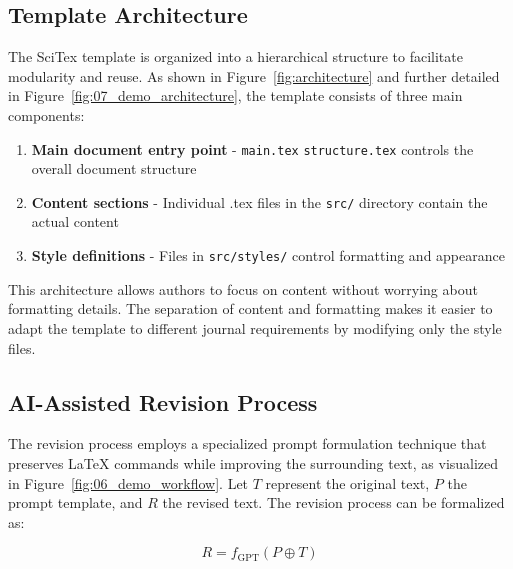 \documentclass[preprint,review,12pt]{elsarticle}%
\providecommand{\DIFaddbegin}{} %
\providecommand{\DIFaddend}{} %
\providecommand{\DIFdelbegin}{} %
\providecommand{\DIFdelend}{} %
\newcommand{\DIFscaledelfig}{0.5}
\newlength{\DIFdelgraphicswidth} %
\newlength{\DIFdelgraphicsheight} %
\newcommand{\DIFaddincludegraphics}[2][]{{\color{blue}\fbox{\DIFOincludegraphics[#1]{#2}}}} %
\newcommand{\DIFdelincludegraphics}[2][]{%
\sbox{\DIFdelgraphicsbox}{\DIFOincludegraphics[#1]{#2}}%
\settoboxwidth{\DIFdelgraphicswidth}{\DIFdelgraphicsbox} %
\settoboxtotalheight{\DIFdelgraphicsheight}{\DIFdelgraphicsbox} %
\scalebox{\DIFscaledelfig}{%
\parbox[b]{\DIFdelgraphicswidth}{\usebox{\DIFdelgraphicsbox}\\[-\baselineskip] \rule{\DIFdelgraphicswidth}{0em}}\llap{\resizebox{\DIFdelgraphicswidth}{\DIFdelgraphicsheight}{%
\setlength{\unitlength}{\DIFdelgraphicswidth}%
\begin{picture}(1,1)%
\thicklines\linethickness{2pt} %
{\color[rgb]{1,0,0}\put(0,0){\framebox(1,1){}}}%
{\color[rgb]{1,0,0}\put(0,0){\line( 1,1){1}}}%
{\color[rgb]{1,0,0}\put(0,1){\line(1,-1){1}}}%
\end{picture}%
}\hspace*{3pt}}} %
} %
\DeclareRobustCommand{\DIFaddbegin}{\DIFOaddbegin \let\includegraphics\DIFaddincludegraphics} %
\DeclareRobustCommand{\DIFaddend}{\DIFOaddend \let\includegraphics\DIFOincludegraphics} %
\DeclareRobustCommand{\DIFdelbegin}{\DIFOdelbegin \let\includegraphics\DIFdelincludegraphics} %
\DeclareRobustCommand{\DIFdelend}{\DIFOaddend \let\includegraphics\DIFOincludegraphics} %
\begin{document}
\begin{frontmatter}

\subsection{Template Architecture}
\label{subsec:architecture}

The SciTex template is organized into a hierarchical structure to facilitate modularity and reuse. As shown in Figure~\ref{fig:architecture} and further detailed in Figure~\ref{fig:07_demo_architecture}, the template consists of three main components:

\begin{enumerate}
    \item \textbf{Main document entry point} - \DIFdelbegin %
{\color{red}%
\verb|main.tex| %
}%
\DIFdelend \DIFaddbegin {\color{blue}%
\verb|structure.tex| %
}%
\DIFaddend controls the overall document structure
    \item \textbf{Content sections} - Individual .tex files in the \verb|src/| directory contain the actual content
    \item \textbf{Style definitions} - Files in \verb|src/styles/| control formatting and appearance
\end{enumerate}

This architecture allows authors to focus on content without worrying about formatting details. The separation of content and formatting makes it easier to adapt the template to different journal requirements by modifying only the style files.


\subsection{AI-Assisted Revision Process}
\label{subsec:ai-revision}

The revision process employs a specialized prompt formulation technique that preserves LaTeX commands while improving the surrounding text, as visualized in Figure~\ref{fig:06_demo_workflow}. Let $T$ represent the original text, $P$ the prompt template, and $R$ the revised text. The revision process can be formalized as:

\begin{equation}
R = f_{\text{GPT}}(P \oplus T)
\end{equation}


\end{frontmatter}
\end{document}
